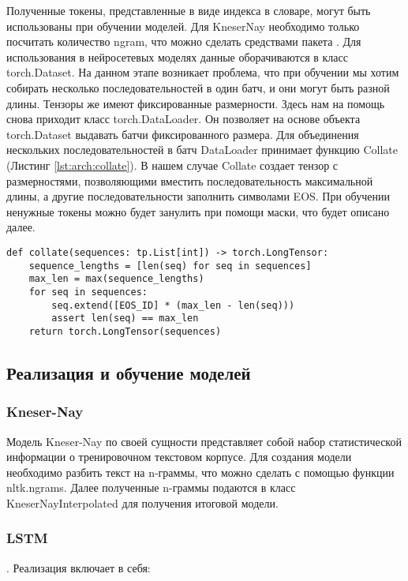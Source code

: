 Полученные токены, представленные в виде индекса в словаре, могут быть использованы при обучении моделей. Для KneserNay необходимо только посчитать количество ngram, что можно сделать средствами пакета . Для использования в нейросетевых моделях данные оборачиваются в класс torch.Dataset. На данном этапе возникает проблема, что при обучении мы хотим собирать несколько последовательностей в один батч, и они могут быть разной длины. Тензоры же имеют фиксированные размерности. Здесь нам на помощь снова приходит класс torch.DataLoader. Он позволяет на основе объекта torch.Dataset выдавать батчи фиксированного размера. Для объединения нескольких последовательностей в батч DataLoader принимает функцию Collate (Листинг \ref{lst:arch:collate}). В нашем случае Collate создает тензор с размерностями, позволяющими вместить последовательность максимальной длины, а другие последовательности заполнить символами EOS. При обучении ненужные токены можно будет занулить при помощи маски, что будет описано далее.

\begin{lstlisting}[caption={Функция collate для сбора последовательностей различной длины в батч}, label=lst:arch:collate]
def collate(sequences: tp.List[int]) -> torch.LongTensor:
	sequence_lengths = [len(seq) for seq in sequences]
	max_len = max(sequence_lengths)
	for seq in sequences:
		seq.extend([EOS_ID] * (max_len - len(seq)))
		assert len(seq) == max_len
	return torch.LongTensor(sequences)    
\end{lstlisting}

\subsection{Реализация и обучение моделей}

\subsubsection{Kneser-Nay} Модель Kneser-Nay по своей сущности представляет собой набор статистической информации о тренировочном текстовом корпусе. Для создания модели необходимо разбить текст на n-граммы, что можно сделать с помощью функции nltk.ngrams. Далее полученные n-граммы подаются в класс KneserNayInterpolated для получения итоговой модели.

\subsubsection{LSTM}. Реализация включает в себя:

